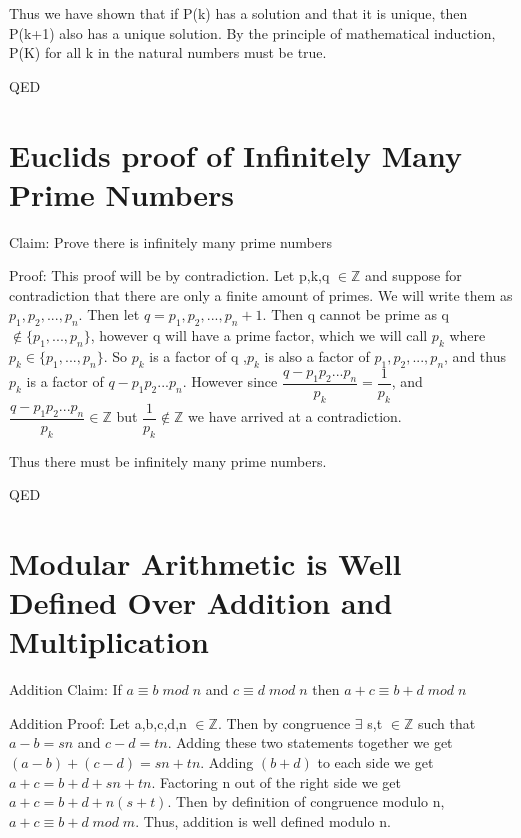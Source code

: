 \documentclass{article}
\begin{document}
Thus we have shown that if P(k) has a solution and that it is unique, then P(k+1) also has a unique solution. By the principle of mathematical induction, P(K) for all k in the natural numbers must be true.

QED

\pagebreak
\section{Euclids proof of Infinitely Many Prime Numbers}

Claim: Prove there is infinitely many prime numbers

Proof: This proof will be by contradiction. Let p,k,q $\in \mathbb{Z}$ and suppose for  contradiction that there are only a finite amount of primes. We will write them as $p_1, p_2,..., p_n$. Then let $q = p_1, p_2, ..., p_n +1$. Then q cannot be prime as q $\notin \{p_1,...,p_n\}$, however q will have a prime factor, which we will call $p_k$ where $p_k \in \{p_1,...,p_n\}$. So $p_k$ is a factor of q ,$p_k$ is also a factor of $p_1, p_2,..., p_n$, and thus $p_k$ is a factor of $q-p_1 p_2... p_n$. However since  $\dfrac{q-p_1 p_2... p_n}{p_k} =\dfrac{1}{p_k}$, and $\dfrac{q-p_1 p_2... p_n}{p_k} \in \mathbb{Z}$ but $\dfrac{1}{p_k} \notin \mathbb{Z}$
we have arrived at a contradiction.

Thus there must be infinitely many prime numbers. 

QED

\pagebreak
\section{Modular Arithmetic is Well Defined Over Addition and Multiplication}

Addition Claim: If $a \equiv b \; mod \; n$ and  $c \equiv d \; mod \; n$ then $a+c \equiv b+d \; mod \; n$

Addition Proof: Let a,b,c,d,n $\in \mathbb{Z}$. Then by congruence $\exists $ s,t $\in \mathbb{Z}$ such that $a-b = sn$ and $c-d = tn$. Adding these two statements together we get $(a-b) + (c-d) = sn + tn$. Adding $(b+d)$ to each side we get $a+c = b+d + sn + tn$. Factoring n out of the right side we get $a+c = b+d +n(s+t)$. Then by definition of congruence modulo n, $a+c \equiv b+d \; mod \; m$. Thus, addition is well defined modulo n.
\end{document}
